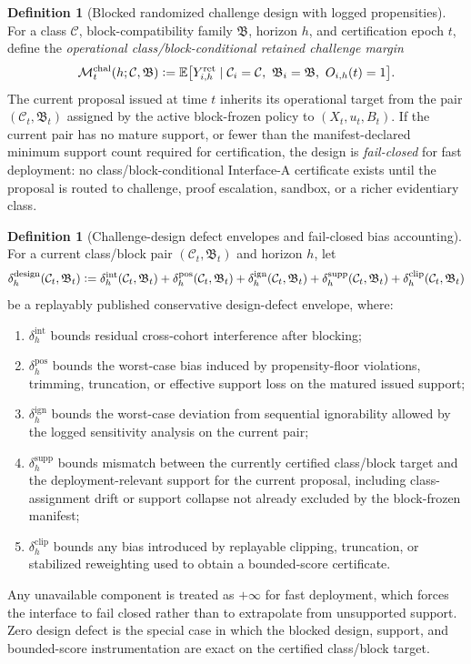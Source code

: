 \documentclass[11pt]{article}
\theoremstyle{definition}
\newtheorem{definition}[theorem]{Definition}
\newcommand{\E}{\mathbb{E}}
\newcommand{\1}{\mathbf{1}}
\newcommand{\Defeq}{\vcentcolon=}
\begin{document}
\begin{definition}[Blocked randomized challenge design with logged propensities]
For a class $\mathcal C$, block-compatibility family $\mathfrak B$, horizon $h$, and certification epoch $t$, define the \emph{operational class/block-conditional retained challenge margin}
\[
\mathcal M_t^{\mathrm{chal}}(h;\mathcal C,\mathfrak B)
\Defeq
\E\bigl[Y_{i,h}^{\mathrm{ret}}\mid \mathcal C_i=\mathcal C,\ \mathfrak B_i=\mathfrak B,\ O_{i,h}(t)=1\bigr].
\]
The current proposal issued at time $t$ inherits its operational target from the pair $(\mathcal C_t,\mathfrak B_t)$ assigned by the active block-frozen policy to $(X_t,u_t,B_t)$. If the current pair has no mature support, or fewer than the manifest-declared minimum support count required for certification, the design is \emph{fail-closed} for fast deployment: no class/block-conditional Interface-A certificate exists until the proposal is routed to challenge, proof escalation, sandbox, or a richer evidentiary class.
\end{definition}

\begin{definition}[Challenge-design defect envelopes and fail-closed bias accounting]\label{def:chal_defects}
For a current class/block pair $(\mathcal C_t,\mathfrak B_t)$ and horizon $h$, let
\[
\delta_h^{\mathrm{design}}(\mathcal C_t,\mathfrak B_t)
\Defeq
\delta_h^{\mathrm{int}}(\mathcal C_t,\mathfrak B_t)
+\delta_h^{\mathrm{pos}}(\mathcal C_t,\mathfrak B_t)
+\delta_h^{\mathrm{ign}}(\mathcal C_t,\mathfrak B_t)
+\delta_h^{\mathrm{supp}}(\mathcal C_t,\mathfrak B_t)
+\delta_h^{\mathrm{clip}}(\mathcal C_t,\mathfrak B_t)
\]
be a replayably published conservative design-defect envelope, where:
\begin{enumerate}[label=(\roman*), leftmargin=2em]
  \item $\delta_h^{\mathrm{int}}$ bounds residual cross-cohort interference after blocking;
  \item $\delta_h^{\mathrm{pos}}$ bounds the worst-case bias induced by propensity-floor violations, trimming, truncation, or effective support loss on the matured issued support;
  \item $\delta_h^{\mathrm{ign}}$ bounds the worst-case deviation from sequential ignorability allowed by the logged sensitivity analysis on the current pair;
  \item $\delta_h^{\mathrm{supp}}$ bounds mismatch between the currently certified class/block target and the deployment-relevant support for the current proposal, including class-assignment drift or support collapse not already excluded by the block-frozen manifest;
  \item $\delta_h^{\mathrm{clip}}$ bounds any bias introduced by replayable clipping, truncation, or stabilized reweighting used to obtain a bounded-score certificate.
\end{enumerate}
Any unavailable component is treated as $+\infty$ for fast deployment, which forces the interface to fail closed rather than to extrapolate from unsupported support. Zero design defect is the special case in which the blocked design, support, and bounded-score instrumentation are exact on the certified class/block target.
\end{definition}
\end{document}
